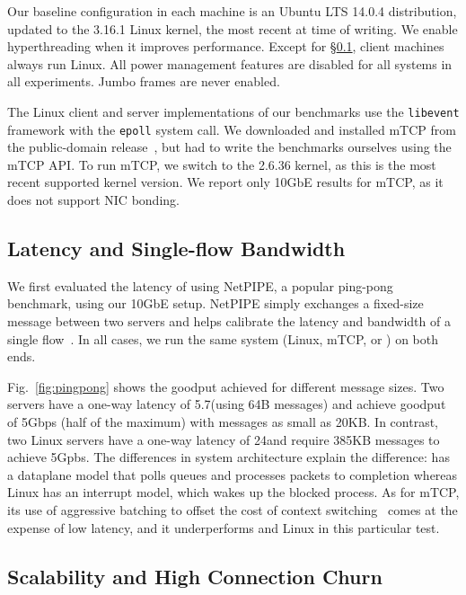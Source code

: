 Our baseline configuration in each
machine is an Ubuntu LTS 14.0.4 distribution, updated to the 3.16.1 Linux kernel, the most
recent at time of writing.
We enable hyperthreading when it improves performance. Except for
\S\ref{sec:eval:netpipe}, client machines always run Linux. All power
management features are disabled for all systems in all
experiments. Jumbo frames are never enabled.


The Linux client and server implementations of our benchmarks use the
\texttt{libevent} framework with the \texttt{epoll} system call.  We
downloaded and installed mTCP from the public-domain
release~\cite{url:mtcp}, but had to write the benchmarks ourselves
using the mTCP API.  To run mTCP, we switch to the 2.6.36 kernel, as
this is the most recent supported kernel version.  We report only
10GbE results for mTCP, as it does not support NIC bonding.


\subsection{Latency and Single-flow Bandwidth}
\label{sec:eval:netpipe}

We first evaluated the latency of \ix using NetPIPE, a popular
ping-pong benchmark, using our 10GbE setup.  NetPIPE simply exchanges
a fixed-size message between two servers and helps calibrate the
latency and bandwidth of a single flow~\cite{snell1996netpipe}.  In
all cases, we run the same system (Linux, mTCP, or \ix) on both ends.

Fig.~\ref{fig:pingpong} shows the goodput achieved for different
message sizes.  Two \ix servers have a one-way latency of
5.7\microsecond (using 64B messages) and achieve goodput of 5Gbps
(half of the maximum) with messages as small as 20KB. In contrast, two
Linux servers have a one-way latency of 24\microsecond and require
385KB messages to achieve 5Gpbs.  The differences in system
architecture explain the difference: \ix has a dataplane model that
polls queues and processes packets to completion whereas Linux has an
interrupt model, which wakes up the blocked process.  
As for mTCP, its use of aggressive batching to offset the cost of
context switching~\cite{jeong2014mtcp} comes at the expense of low
latency, and it underperforms \ix and Linux in this particular test.




\subsection{Scalability and High Connection Churn}
\label{sec:eval:short}



